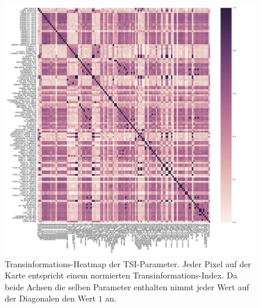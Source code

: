 \begin{figure}[H]
	\centering
	\includegraphics[scale=.42]{heatmaps/tsi.pdf}
	\caption[Transinformations-Heatmap der TSI-Parameter]{Transinformations-Heatmap der TSI-Parameter. Jeder Pixel auf der Karte entspricht einem normierten Transinformations-Index. Da beide Achsen die selben Parameter enthalten nimmt jeder Wert auf der Diagonalen den Wert $\num{1}$ an.}
    \label{heatmap_tsi_inline}
\end{figure}

